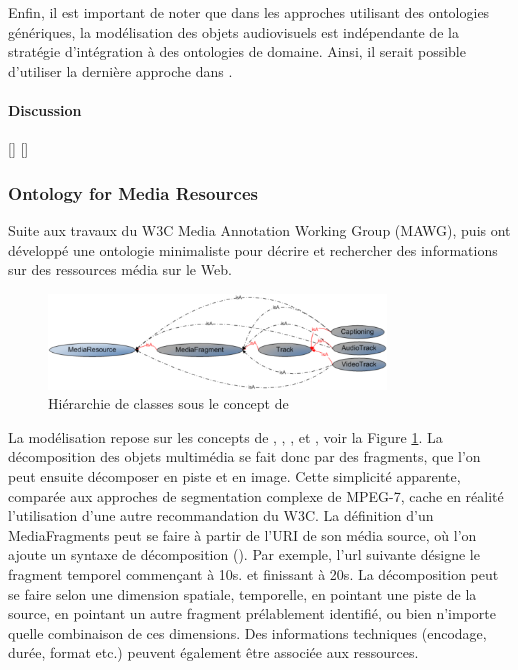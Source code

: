 Enfin, il est important de noter que dans les approches utilisant des ontologies génériques, la modélisation des objets audiovisuels est indépendante de la stratégie d'intégration à des ontologies de domaine. 
Ainsi, il serait possible d'utiliser la dernière approche dans .

\paragraph{Discussion}
[]
[]




\subsubsection{Ontology for Media Resources}
Suite aux travaux du W3C Media Annotation Working Group (MAWG), \cite{Burger2011} puis \cite{Lee2012} ont développé une ontologie minimaliste pour décrire et rechercher des informations sur des ressources média sur le Web.

\begin{figure}[ht!]
\centering
\includegraphics[width=0.8\textwidth]{images/MA-model.png}
\caption{Hiérarchie de classes sous le concept de }
\label{img:ma-model}
\end{figure}

La modélisation repose sur les concepts de , , ,  et , voir la Figure \ref{img:ma-model}.
La décomposition des objets multimédia se fait donc par des fragments, que l'on peut ensuite décomposer en piste et en image.
Cette simplicité apparente, comparée aux approches de segmentation complexe de MPEG-7, cache en réalité l'utilisation d'une autre recommandation du W3C.
La définition d'un MediaFragments peut se faire à partir de l'URI de son média source, où l'on ajoute un syntaxe de décomposition (\cite{Hausenblas2011}).
Par exemple, l'url suivante  désigne le fragment temporel commençant à 10s. et finissant à 20s.
La décomposition peut se faire selon une dimension spatiale, temporelle, en pointant une piste de la source, en pointant un autre fragment prélablement identifié, ou bien n'importe quelle combinaison de ces dimensions.
Des informations techniques (encodage, durée, format etc.) peuvent également être associée aux ressources.

